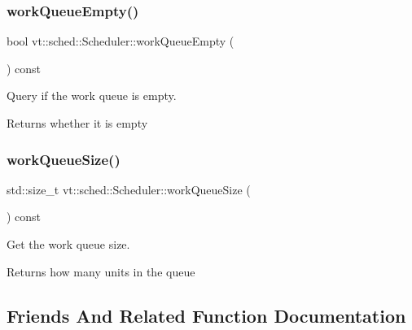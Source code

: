 \subsubsection{\texorpdfstring{work\+Queue\+Empty()}{workQueueEmpty()}}
{\footnotesize\ttfamily bool vt\+::sched\+::\+Scheduler\+::work\+Queue\+Empty (\begin{DoxyParamCaption}{ }\end{DoxyParamCaption}) const\hspace{0.3cm}{\ttfamily [inline]}}



Query if the work queue is empty. 

\begin{DoxyReturn}{Returns}
whether it is empty 
\end{DoxyReturn}
\mbox{\label{structvt_1_1sched_1_1_scheduler_a6ee315ffd90f37a277bb2b5622af1f4f}} 
\subsubsection{\texorpdfstring{work\+Queue\+Size()}{workQueueSize()}}
{\footnotesize\ttfamily std\+::size\+\_\+t vt\+::sched\+::\+Scheduler\+::work\+Queue\+Size (\begin{DoxyParamCaption}{ }\end{DoxyParamCaption}) const\hspace{0.3cm}{\ttfamily [inline]}}



Get the work queue size. 

\begin{DoxyReturn}{Returns}
how many units in the queue 
\end{DoxyReturn}


\subsection{Friends And Related Function Documentation}
\mbox{\label{structvt_1_1sched_1_1_scheduler_a71bf858d697b14435f4b7e525d2dffde}} 
